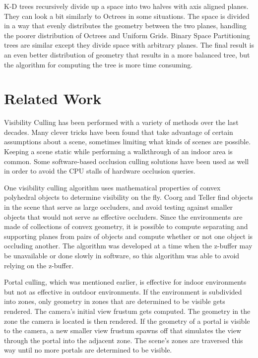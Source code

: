 \documentclass[12pt]{ucthesis}
\begin{document}
K-D trees recursively divide up a space into two halves with axis aligned planes.\cite{Vis-Computations-Densely-Occluded, Doom3-source-review}
They can look a bit similarly to Octrees in some situations.
The space is divided in a way that evenly distributes the geometry between the two planes, handling the poorer distribution of Octrees and Uniform Grids.
Binary Space Partitioning trees are similar except they divide space with arbitrary planes.
The final result is an even better distribution of geometry that results in a more balanced tree, but the algorithm for computing the tree is more time consuming.

\chapter{Related Work}
\label{related-work}

Visibility Culling has been performed with a variety of methods over the last decades.
Many clever tricks have been found that take advantage of certain assumptions about a scene, sometimes limiting what kinds of scenes are possible.
Keeping a scene static while performing a walkthrough of an indoor area is common.\cite{Vis-Computations-Densely-Occluded, Portals-mirrors, Doom3-source-review}
Some software-based occlusion culling solutions have been used as well in order to avoid the CPU stalls of hardware occlusion queries.\cite{spliter, culling-bf}

One visibility culling algorithm uses mathematical properties of convex polyhedral objects to determine visibility on the fly.\cite{large-occluders}
Coorg and Teller find objects in the scene that serve as large occluders, and avoid testing against smaller objects that would not serve as effective occluders.
Since the environments are made of collections of convex geometry, it is possible to compute separating and supporting planes from pairs of objects and compute whether or not one object is occluding another.
The algorithm was developed at a time when the z-buffer may be unavailable or done slowly in software, so this algorithm was able to avoid relying on the z-buffer.

Portal culling, which was mentioned earlier, is effective for indoor environments but not as effective in outdoor environments.\cite{Portals-mirrors}
If the environment is subdivided into zones, only geometry in zones that are determined to be visible gets rendered.
The camera's initial view frustum gets computed.
The geometry in the zone the camera is located is then rendered.
If the geometry of a portal is visible to the camera, a new smaller view frustum spawns off that simulates the view through the portal into the adjacent zone.
The scene's zones are traversed this way until no more portals are determined to be visible.
\end{document}
